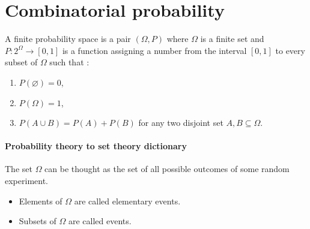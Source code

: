 \section{Combinatorial probability}
\begin{definition}
A finite probability space is a pair $(\Omega,P)$ where $\Omega$ is a finite set and $P:2^{\Omega}\to[0,1]$ is a function assigning a number from the interval $[0,1]$ to every subset of $\Omega$ such that :
\begin{enumerate}
\item $P(\varnothing)=0$,
\item $P(\Omega)=1$,
\item $P(A\cup B)=P(A)+P(B)$ for any two disjoint set $A,B\subseteq \Omega$.
\end{enumerate}
\end{definition}
\paragraph{Probability theory to set theory dictionary} The set $\Omega$ can be thought as the set of all possible outcomes of some random experiment. 
\begin{itemize}
\item Elements of $\Omega$ are called elementary events.
\item Subsets of $\Omega$ are called events.
\end{itemize}

